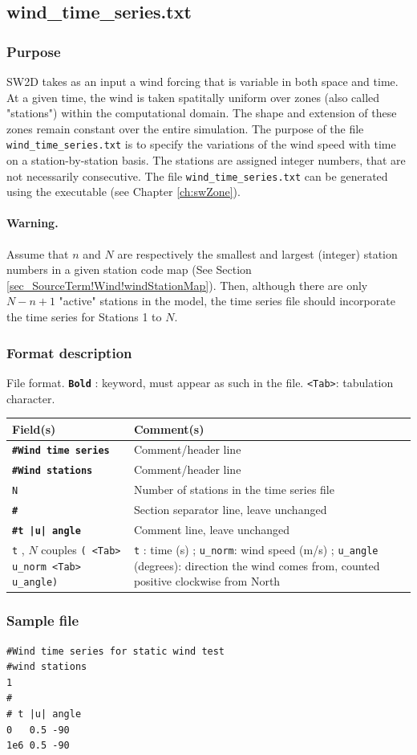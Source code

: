 \subsection{wind\_time\_series.txt}\label{sec_SourceTerm!Wind!windTimeSeries}
\subsubsection{Purpose}
SW2D takes as an input a wind forcing that is variable in both space and time. At a given time, the wind is taken spatitally uniform over zones (also called "stations") within the computational domain. The shape and extension of these zones remain constant over the entire simulation. The purpose of the file \texttt{wind\_time\_series.txt} is to specify the variations of the wind speed with time on a station-by-station basis. The stations are assigned integer numbers, that are not necessarily consecutive. 
The file \texttt{wind\_time\_series.txt} can be generated using the \swZone executable (see Chapter \ref{ch:swZone}).
%
\paragraph*{Warning.}
Assume that $n$ and $N$ are respectively the smallest and largest (integer) station numbers in a given station code map (See Section \ref{sec_SourceTerm!Wind!windStationMap}). Then, although there are only $N - n + 1$ "active" stations in the model, the time series file should incorporate the time series for Stations 1 to $N$.
%
\subsubsection{Format description}
%
File format.  \texttt{\textbf{Bold}} : keyword, must appear as such in the file. \texttt{<Tab>}: tabulation character. \\
    \begin{tabular}{p{6cm} | p{9cm}}
    \hline
    Field(s) & Comment(s) \\
    \hline  \hline
    \texttt{\textbf{\#Wind time series}}  & Comment/header line \\ \hline
    \texttt{\textbf{\#Wind stations}}  & Comment/header line \\ \hline
    \texttt{N} & Number of stations in the time series file \\ \hline
    \texttt{\textbf{\#}} & Section separator line, leave unchanged \\  \hline
    \texttt{\textbf{\#t |u| angle}} & Comment line, leave unchanged \\  \hline
    \texttt{t} , $N$ couples \texttt{( <Tab> u\_norm <Tab> u\_angle) } & \texttt{t} : time (s) ; \texttt{u\_norm}: wind speed (m/s) ; \texttt{u\_angle} (degrees): direction the wind comes from, counted positive clockwise from North \\ \hline
    \end{tabular}
\subsubsection{Sample file}
%
\begin{verbatim}
#Wind time series for static wind test
#wind stations
1
#
# t |u|	angle
0 	0.5 -90 
1e6	0.5	-90
\end{verbatim}